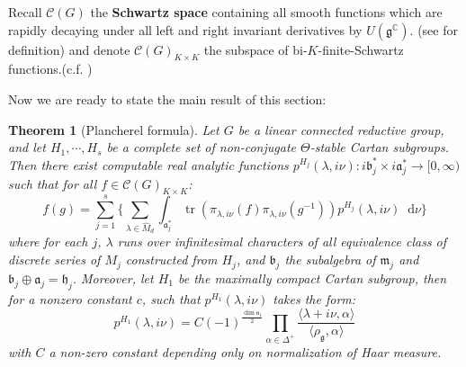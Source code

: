 \documentclass[11pt]{report}
\theoremstyle{definition}
\theoremstyle{plain}
\newtheorem{Theo}[Def]{Theorem}
\DeclareMathOperator{\tr}{tr}
\newcommand{\complex}{\mathbb{C}}
\newcommand{\brac}[1]{\langle #1 \rangle}
\renewcommand{\hat}{\widehat}
\newcommand{\mass}[1]{\mathop{}\mathrm{d}{#1}}
\newcommand{\Lie}[1]{\mathfrak{#1}}
\begin{document}
\par Recall $\mathcal{C}(G)$ the \textbf{Schwartz space} containing all smooth functions which are rapidly decaying under all left and right invariant derivatives by $U(\Lie{g}^\complex)$. (see \cite[Chapter~XII.\S 4]{knapp2016} for definition) and denote $\mathcal{C}(G)_{K\times K}$ the subspace of bi-$K$-finite-Schwartz functions.(c.f. ) 
\par Now we are ready to state the main result of this section:
\begin{Theo}[Plancherel formula]\label{plancherel}
	\textnormal{\cite[Theorem~13.11]{knapp2016}} Let $G$ be a linear connected reductive group, and let $H_1,\cdots, H_s$ be a complete set of non-conjugate $\Theta$-stable Cartan subgroups. Then there exist computable real analytic functions $p^{H_j}(\lambda, i\nu):i\Lie{b}_j^*\times i\Lie{a}_j^*\to [0, \infty)$ such that for all $f\in \mathcal{C}(G)_{K\times K}$: 
	\begin{equation}
	f(g)=\sum^{s}_{j=1}\Big\{\sum_{\lambda\in \hat{M}_d}\int_{\Lie{a}_j^*}\tr(\pi_{\lambda, i\nu}(f)\pi_{\lambda, i\nu}(g^{-1})) p^{H_j}(\lambda, i\nu)\mass{\nu}\Big\}
	\end{equation}
	where for each $j$, $\lambda$ runs over infinitesimal characters of all equivalence class of discrete series of $M_{j}$ constructed from $H_j$, and $\Lie{b}_j$ the subalgebra of $\Lie{m}_{j}$ and $\Lie{b}_j\oplus \Lie{a}_j=\Lie{h}_j$. Moreover, let $H_1$ be the maximally compact Cartan subgroup, then for a nonzero constant $c$, such that $p^{H_1}(\lambda, i\nu)$ takes the form:
	\begin{equation}
	p^{H_1}(\lambda, i\nu)=C(-1)^{\frac{\dim \Lie{n}_1}{2}}\prod_{\alpha\in \Delta^+}\frac{\brac{\lambda+i\nu, \alpha}}{\brac{\rho_{\Lie{g}},\alpha}}
	\end{equation}
	with $C$ a non-zero constant depending only on normalization of Haar measure.
\end{Theo}
\end{document}
